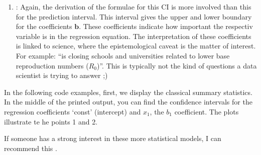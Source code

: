 \documentclass[letterpaper,10pt,english]{jupyterBook}
\begin{document}
\begin{enumerate}
%
\item {} 
\sphinxAtStartPar
{}: Again, the derivation of the formulae for this CI is more involved than this for the prediction interval. This interval gives the upper and lower boundary for the coefficients \(\mathbf{b}\). These coefficients indicate how important the respectiv variable is in the regression equation. The interpretation of these coefficients is linked to  science, where the epistemological caveat is the matter of interest. For example: “is closing schools and universities related to lower base reproduction numbers (\(R_0\))”. This is typically not the kind of questions a data scientist is trying to answer ;\sphinxhyphen{})

\end{enumerate}

\sphinxAtStartPar
In the following code examples, first, we display the classical summary statistics. In the middle of the printed output, you can find the confidence intervals for the regression coefficients ‘const’ (intercept) and \(x_1\), the \(b_1\) coefficient. The plots illustrate te he points 1 and 2.

\sphinxAtStartPar
If someone has a strong interest in these more statistical models, I can recommend this .
\end{document}
